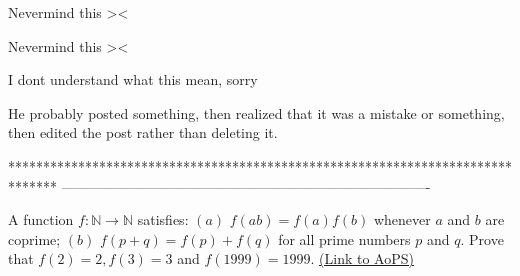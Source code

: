 \begin{solution}
	Nevermind this ><
\end{solution}



\begin{solution}
	\begin{tcolorbox}Nevermind this ><\end{tcolorbox}

I dont understand what this mean, sorry
\end{solution}



\begin{solution}
	He probably posted something, then realized that it was a mistake or something, then edited the post rather than deleting it.
\end{solution}
*******************************************************************************
-------------------------------------------------------------------------------

\begin{problem}
	A function $ f: \mathbb{N} \rightarrow \mathbb{N}$ satisfies:
$ (a)$ $ f(ab)=f(a)f(b)$ whenever $ a$ and $ b$ are coprime;
$ (b)$ $ f(p+q)=f(p)+f(q)$ for all prime numbers $ p$ and $ q$.
Prove that $ f(2)=2,f(3)=3$ and $ f(1999)=1999.$
	\flushright \href{https://artofproblemsolving.com/community/c6h286832}{(Link to AoPS)}
\end{problem}




